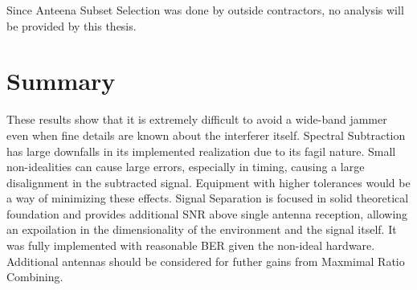 Since Anteena Subset Selection was done by outside contractors, no analysis will be provided by this thesis.  

\section{Summary}

These results show that it is extremely difficult to avoid a wide-band jammer even when fine details are known about the interferer itself.  Spectral Subtraction has large downfalls in its implemented realization due to its fagil nature.  Small non-idealities can cause large errors, especially in timing, causing a large disalignment in the subtracted signal.  Equipment with higher tolerances would be a way of minimizing these effects.  Signal Separation is focused in solid theoretical foundation and provides additional SNR above single antenna reception, allowing an expoilation in the dimensionality of the environment and the signal itself.  It was fully implemented with reasonable BER given the non-ideal hardware.  Additional antennas should be considered for futher gains from Maxmimal Ratio Combining.\\




